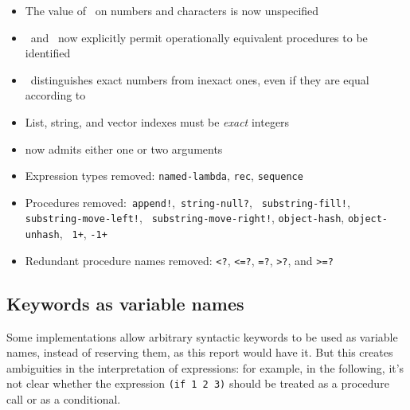\begin{itemize}
\item The value of \ on numbers and characters is now unspecified

\item {}\ and \ now explicitly permit operationally equivalent
procedures to be identified

\item {}\ distinguishes exact numbers from inexact ones, even if they
are equal according to \ide{=}

\item List, string, and vector indexes must be {\em exact} integers

\item {} now admits either one or two arguments


\item Expression types removed: {\tt named-lambda}, {\tt rec}, \hbox{\tt sequence}

\item Procedures removed:~{\tt append!},~{\tt string-null?}, {\tt
substring-fill!}, {\tt substring-move-left!}, {\tt
substring-move-right!}, {\tt object-hash}, {\tt object-unhash}, {\tt
1+}, {\tt -1+}

\item Redundant procedure names removed: {\tt <?}, {\tt <=?}, {\tt =?},
{\tt >?}, and {\tt >=?}

\end{itemize}




\subsection*{Keywords as variable names}

Some implementations allow arbitrary syntactic
keywords to be used as variable
names, instead of reserving them, as this report would have
it. But this creates ambiguities in the interpretation
of expressions: for example, in the following, it's not clear whether
the expression {\tt (if 1 2 3)} should be treated as a procedure call or
as a conditional.

